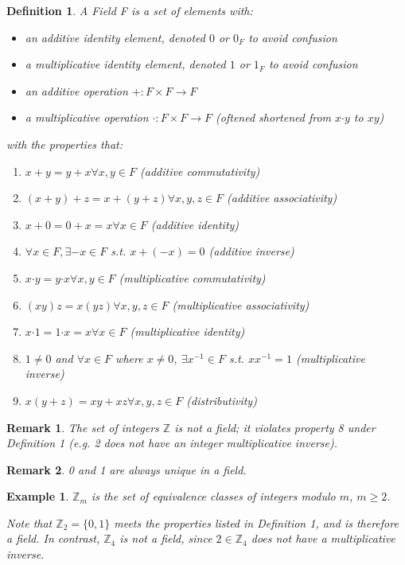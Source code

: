 \documentclass[10pt, oneside]{article}
\newcommand{\Z}{\mathbb{Z}}
\newcommand{\Cdot}{\boldsymbol{\cdot}}
\newtheorem{defn}{Definition}
\newtheorem{rem}{Remark}
\newtheorem{ex}{Example}
\begin{document}
\begin{defn}
    A {\em Field} F is a set of elements with:
    \begin{itemize}
        \item an additive identity element, denoted $0$ or $0_F$ to avoid confusion
        \item a multiplicative identity element, denoted $1$ or $1_F$ to avoid confusion
        \item an additive operation $+: F \times F \to F$
        \item a multiplicative operation $\Cdot: F \times F \to F$ (oftened shortened from $x \Cdot y$ to $xy$)
    \end{itemize}
    with the properties that:
    \begin{enumerate}
        \item $x + y = y + x \forall x, y \in F$ (additive commutativity)
        \item $(x + y) + z = x + (y + z) \forall x, y, z \in F$ (additive associativity)
        \item $x + 0 = 0 + x = x \forall x \in F$ (additive identity)
        \item $\forall x \in F, \exists -x \in F$ s.t. $x + (-x) = 0$ (additive inverse)
        \item $x \Cdot y = y \Cdot x \forall x, y \in F$ (multiplicative commutativity)
        \item $(xy)z = x(yz) \forall x, y, z \in F$ (multiplicative associativity)
        \item $x \Cdot 1 = 1 \Cdot x = x \forall x \in F$ (multiplicative identity)
        \item $1 \neq 0$ and $\forall x \in F$ where $x \neq 0$, $\exists x^{-1} \in F$ s.t. $xx^{-1} = 1$ (multiplicative inverse)
        \item $x(y + z) = xy + xz \forall x, y, z \in F$ (distributivity) 
    \end{enumerate}
\end{defn}

\begin{rem}
The set of integers $\Z$ is \textit{not} a field; it violates property 8 under Definition 1 (e.g. 2 does not have an integer multiplicative inverse).
\end{rem}

\begin{rem}
    0 and 1 are always unique in a field.
\end{rem}

\begin{ex}
$\Z_m$ is the set of equivalence classes of integers modulo $m$, $m \geq 2$.

Note that $\Z_2 = \{ 0, 1 \}$ meets the properties listed in Definition 1, and is therefore a field. In contrast, $\Z_4$ is not a field, since $2 \in \Z_4$ does not have a multiplicative inverse.
\end{ex}
\end{document}
